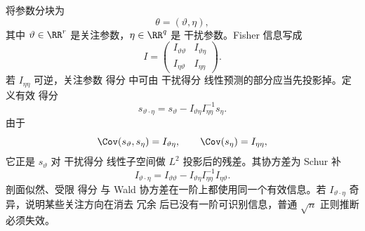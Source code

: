 \begin{proposition}[干扰参数与有效信息]
将参数分块为
\[
 \theta=(\vartheta,\eta),
\]
其中 $\vartheta\in\RR^r$ 是关注参数，$\eta\in\RR^q$ 是 干扰参数。Fisher 信息写成
\[
 I=
 \begin{pmatrix}
 I_{\vartheta\vartheta}&I_{\vartheta\eta}\\
 I_{\eta\vartheta}&I_{\eta\eta}
 \end{pmatrix}.
\]
若 $I_{\eta\eta}$ 可逆，关注参数 得分 中可由 干扰得分 线性预测的部分应当先投影掉。定义有效 得分
\begin{equation*}s_{\vartheta\cdot\eta}
 =s_\vartheta-I_{\vartheta\eta}I_{\eta\eta}^{-1}s_\eta.
\end{equation*}
由于
\[
 \Cov(s_\vartheta,s_\eta)=I_{\vartheta\eta},
 \qquad
 \Cov(s_\eta)=I_{\eta\eta},
\]
它正是 $s_\vartheta$ 对 干扰得分 线性子空间做 $L^2$ 投影后的残差。其协方差为 Schur 补
\begin{equation*}I_{\vartheta\cdot\eta}
 =I_{\vartheta\vartheta}
 -I_{\vartheta\eta}I_{\eta\eta}^{-1}I_{\eta\vartheta}.
\end{equation*}
剖面似然、受限 得分 与 Wald 协方差在一阶上都使用同一个有效信息。若 $I_{\vartheta\cdot\eta}$ 奇异，说明某些关注方向在消去 冗余 后已没有一阶可识别信息，普通 $\sqrt n$ 正则推断必须失效。
\end{proposition}

